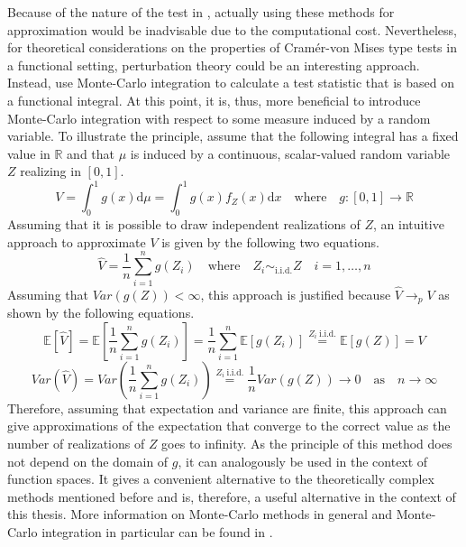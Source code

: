 \documentclass[12pt, a4paper]{article}
\theoremstyle{MAstyle} \newtheorem{assumption}{Assumption}[section]
\theoremstyle{MAstyle} \newtheorem{definition}{Definition}[section]
\theoremstyle{MAstyle} \newtheorem{theorem}{Theorem}[section]
\begin{document}
			Because of the nature of the test in \cite{bugni_permutation_2021}, actually using these methods for approximation would be inadvisable due to the computational cost. Nevertheless, for theoretical considerations on the properties of Cram\'{e}r-von Mises type tests in a functional setting, perturbation theory could be an interesting approach. 
			Instead, \cite{bugni_permutation_2021} use Monte-Carlo integration to calculate a test statistic that is based on a functional integral. At this point, it is, thus, more beneficial to introduce Monte-Carlo integration with respect to some measure induced by a random variable. 
			To illustrate the principle, assume that the following integral has a fixed value in $\mathbb{R}$ and that $\mu$ is induced by a continuous, scalar-valued random variable $Z$ realizing in $[0,1]$.
			\begin{equation}
				V = \int_{0}^{1} g(x) \mathrm{d}\mu = \int_{0}^{1} g(x) f_Z(x) \mathrm{d}x \quad \text{where} \quad g:[0,1] \rightarrow \mathbb{R}
			\end{equation}
			Assuming that it is possible to draw independent realizations of $Z$, an intuitive approach to approximate $V$ is given by the following two equations.
			\begin{equation}
				\hat{V} = \frac{1}{n} \sum_{i = 1}^{n} g(Z_i) \quad \text{where} \quad Z_i \sim_{\text{i.i.d.}} Z \quad i = 1, \dots, n
			\end{equation}
			Assuming that $\textit{Var}(g(Z)) < \infty$, this approach is justified because $\hat{V} \rightarrow_p V$ as shown by the following equations.
			\begin{equation}
					\mathbb{E}[\hat{V}] = \mathbb{E}\left[\frac{1}{n}\sum_{i = 1}^{n} g(Z_i)\right] = \frac{1}{n}\sum_{i = 1}^{n}\mathbb{E}\left[g(Z_i)\right] \stackrel{Z_i \ \text{i.i.d.}}{=} \mathbb{E}\left[g(Z)\right] = V
			\end{equation}
			\begin{equation}
				\textit{Var}\left(\hat{V}\right) = \textit{Var}\left(\frac{1}{n}\sum_{i = 1}^{n} g(Z_i)\right) \stackrel{Z_i \ \text{i.i.d.}}{=} 
				\frac{1}{n} \textit{Var}\left(g(Z)\right) \rightarrow 0 \quad \text{as} \quad n \rightarrow \infty
			\end{equation}
			Therefore, assuming that expectation and variance are finite, this approach can give approximations of the expectation that converge to the correct value as the number of realizations of $Z$ goes to infinity.
			As the principle of this method does not depend on the domain of $g$, it can analogously be used in the context of function spaces. It gives a convenient alternative to the theoretically complex methods mentioned before and is, therefore, a useful alternative in the context of this thesis. More information on Monte-Carlo methods in general and Monte-Carlo integration in particular can be found in \cite{shonkwiler_explorations_2009}.
		
\end{document}
